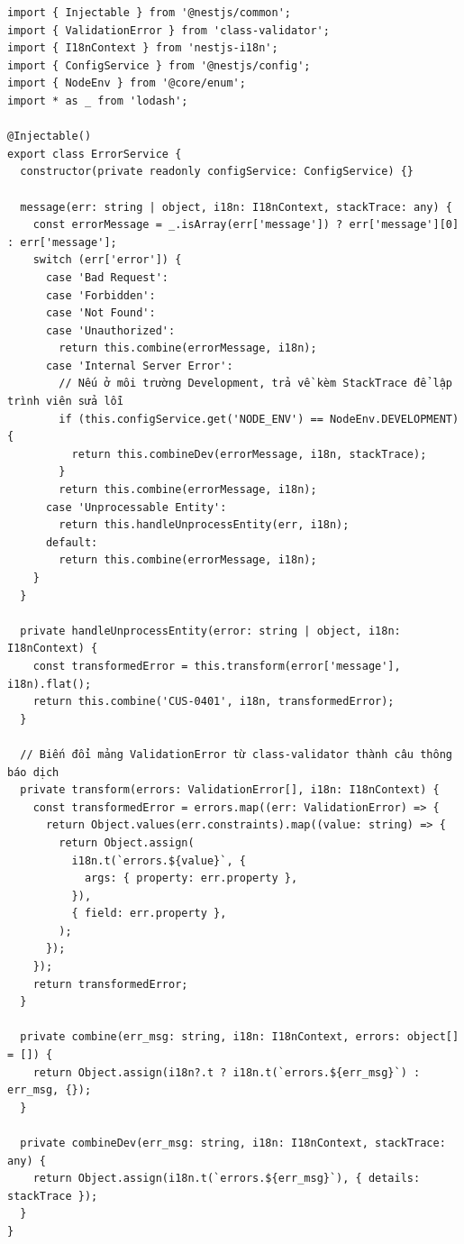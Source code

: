 \documentclass[12pt,a4paper,oneside]{book}
\begin{document}
\begin{codebox}
\begin{Verbatim}[fontsize=\small]
import { Injectable } from '@nestjs/common';
import { ValidationError } from 'class-validator';
import { I18nContext } from 'nestjs-i18n';
import { ConfigService } from '@nestjs/config';
import { NodeEnv } from '@core/enum';
import * as _ from 'lodash';

@Injectable()
export class ErrorService {
  constructor(private readonly configService: ConfigService) {}

  message(err: string | object, i18n: I18nContext, stackTrace: any) {
    const errorMessage = _.isArray(err['message']) ? err['message'][0] : err['message'];
    switch (err['error']) {
      case 'Bad Request':
      case 'Forbidden':
      case 'Not Found':
      case 'Unauthorized':
        return this.combine(errorMessage, i18n);
      case 'Internal Server Error':
        // Nếu ở môi trường Development, trả về kèm StackTrace để lập trình viên sửa lỗi
        if (this.configService.get('NODE_ENV') == NodeEnv.DEVELOPMENT) {
          return this.combineDev(errorMessage, i18n, stackTrace);
        }
        return this.combine(errorMessage, i18n);
      case 'Unprocessable Entity':
        return this.handleUnprocessEntity(err, i18n);
      default:
        return this.combine(errorMessage, i18n);
    }
  }

  private handleUnprocessEntity(error: string | object, i18n: I18nContext) {
    const transformedError = this.transform(error['message'], i18n).flat();
    return this.combine('CUS-0401', i18n, transformedError);
  }

  // Biến đổi mảng ValidationError từ class-validator thành câu thông báo dịch
  private transform(errors: ValidationError[], i18n: I18nContext) {
    const transformedError = errors.map((err: ValidationError) => {
      return Object.values(err.constraints).map((value: string) => {
        return Object.assign(
          i18n.t(`errors.${value}`, {
            args: { property: err.property },
          }),
          { field: err.property },
        );
      });
    });
    return transformedError;
  }

  private combine(err_msg: string, i18n: I18nContext, errors: object[] = []) {
    return Object.assign(i18n?.t ? i18n.t(`errors.${err_msg}`) : err_msg, {});
  }

  private combineDev(err_msg: string, i18n: I18nContext, stackTrace: any) {
    return Object.assign(i18n.t(`errors.${err_msg}`), { details: stackTrace });
  }
}
\end{Verbatim}
\end{codebox}
\end{document}
